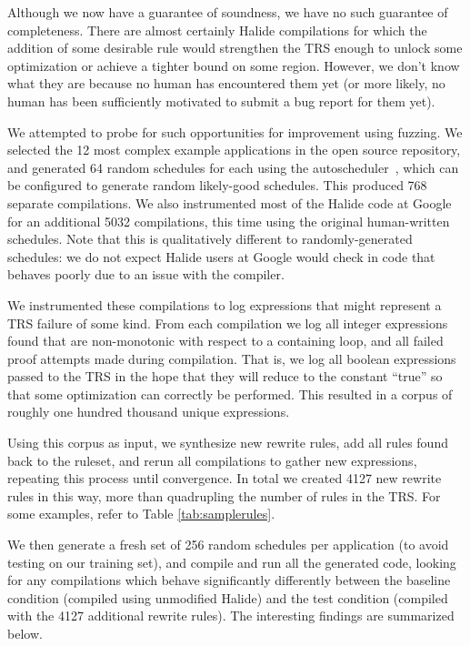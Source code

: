 \documentclass[acmsmall,review]{acmart}\settopmatter{printfolios=true,printccs=false,printacmref=false}
\begin{document}

Although we now have a guarantee of soundness, we have no such guarantee of completeness. There are almost certainly Halide compilations for which the addition of some desirable rule would strengthen the TRS enough to unlock some optimization or achieve a tighter bound on some region. However, we don’t know what they are because no human has encountered them yet (or more likely, no human has been sufficiently motivated to submit a bug report for them yet). 

We attempted to probe for such opportunities for improvement using fuzzing. We selected the 12 most complex example applications in the open source repository, and generated 64 random schedules for each using the autoscheduler~\cite{Adams2019}, which can be configured to generate random likely-good schedules. This produced 768 separate compilations. We also instrumented most of the Halide code at Google for an additional 5032 compilations, this time using the original human-written schedules. Note that this is qualitatively different to randomly-generated schedules: we do not expect Halide users at Google would check in code that behaves poorly due to an issue with the compiler.

We instrumented these compilations to log expressions that might represent a TRS failure of some kind. From each compilation we log all integer expressions found that are non-monotonic with respect to a containing loop, and all failed proof attempts made during compilation. That is, we log all boolean expressions passed to the TRS in the hope that they will reduce to the constant “true” so that some optimization can correctly be performed. This resulted in a corpus of roughly one hundred thousand unique expressions.

Using this corpus as input, we synthesize new rewrite rules, add all rules found back to the ruleset, and rerun all compilations to gather new expressions, repeating this process until convergence. In total we created 4127 new rewrite rules in this way, more than quadrupling the number of rules in the TRS. For some examples, refer to Table \ref{tab:samplerules}.

We then generate a fresh set of 256 random schedules per application (to avoid testing on our training set), and compile and run all the generated code, looking for any compilations which behave significantly differently between the baseline condition (compiled using unmodified Halide) and the test condition (compiled with the 4127 additional rewrite rules). The interesting findings are summarized below.
\end{document}
